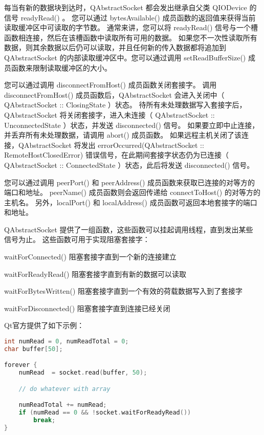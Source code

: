 每当有新的数据块到达时，QAbstractSocket 都会发出继承自父类 QIODevice 的信号 readyRead() 。 您可以通过 bytesAvailable() 成员函数的返回值来获得当前读取缓冲区中可读取的字节数。 通常来讲，您可以将 readyRead() 信号与一个槽函数相连接，然后在该槽函数中读取所有可用的数据。 如果您不一次性读取所有数据，则其余数据以后仍可以读取，并且任何新的传入数据都将追加到 QAbstractSocket 的内部读取缓冲区中。您可以通过调用 setReadBufferSize() 成员函数来限制读取缓冲区的大小。

您可以通过调用 disconnectFromHost() 成员函数关闭套接字。 调用 disconnectFromHost() 成员函数后，QAbstractSocket 会进入关闭中（ QAbstractSocket :: ClosingState ）状态。 待所有未处理数据写入套接字后，QAbstractSocket 将关闭套接字，进入未连接（ QAbstractSocket :: UnconnectedState ）状态，并发送 disconnected() 信号。 如果要立即中止连接，并丢弃所有未处理数据，请调用 abort() 成员函数。 如果远程主机关闭了该连接，QAbstractSocket 将发出 errorOccurred(QAbstractSocket :: RemoteHostClosedError) 错误信号，在此期间套接字状态仍为已连接（ QAbstractSocket :: ConnectedState ）状态，此后将发送 disconnected() 信号。

您可以通过调用 peerPort() 和 peerAddress() 成员函数来获取已连接的对等方的端口和地址。 peerName() 成员函数则会返回传递给 connectToHost() 的对等方的主机名。 另外，localPort() 和 localAddress() 成员函数可返回本地套接字的端口和地址。

QAbstractSocket 提供了一组函数，这些函数可以挂起调用线程，直到发出某些
信号为止。 这些函数可用于实现阻塞套接字：

\begin{compactitem}
\item waitForConnected() 阻塞套接字直到一个新的连接建立
\item waitForReadyRead() 阻塞套接字直到有新的数据可以读取
\item waitForBytesWritten() 阻塞套接字直到一个有效的荷载数据写入到了套接字
\item waitForDisconnected() 阻塞套接字直到连接已经关闭
\end{compactitem}



Qt官方提供了如下示例：

\begin{lstlisting}[language=C++]
int numRead = 0, numReadTotal = 0;
char buffer[50];

forever {
	numRead  = socket.read(buffer, 50);

	// do whatever with array

	numReadTotal += numRead;
	if (numRead == 0 && !socket.waitForReadyRead())
		break;
}

\end{lstlisting}


